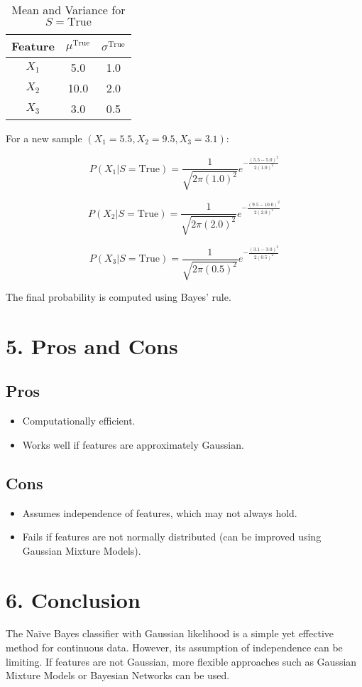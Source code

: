 \documentclass{article}
\begin{document}
\begin{table}[h]
    \centering
    \begin{tabular}{c|cc}
        \toprule
        Feature & \( \mu^{\text{True}} \) & \( \sigma^{\text{True}} \) \\
        \midrule
        \( X_1 \) & 5.0 & 1.0 \\
        \( X_2 \) & 10.0 & 2.0 \\
        \( X_3 \) & 3.0 & 0.5 \\
        \bottomrule
    \end{tabular}
    \caption{Mean and Variance for \( S = \text{True} \)}
\end{table}

For a new sample \( (X_1 = 5.5, X_2 = 9.5, X_3 = 3.1) \):

\[
P(X_1 | S = \text{True}) = \frac{1}{\sqrt{2 \pi (1.0)^2}} e^{-\frac{(5.5 - 5.0)^2}{2 (1.0)^2}}
\]

\[
P(X_2 | S = \text{True}) = \frac{1}{\sqrt{2 \pi (2.0)^2}} e^{-\frac{(9.5 - 10.0)^2}{2 (2.0)^2}}
\]

\[
P(X_3 | S = \text{True}) = \frac{1}{\sqrt{2 \pi (0.5)^2}} e^{-\frac{(3.1 - 3.0)^2}{2 (0.5)^2}}
\]

The final probability is computed using Bayes' rule.

\section{5. Pros and Cons}
\subsection{Pros}
\begin{itemize}
    \item Computationally efficient.
    \item Works well if features are approximately Gaussian.
\end{itemize}

\subsection{Cons}
\begin{itemize}
    \item Assumes independence of features, which may not always hold.
    \item Fails if features are not normally distributed (can be improved using Gaussian Mixture Models).
\end{itemize}

\section{6. Conclusion}
The Naïve Bayes classifier with Gaussian likelihood is a simple yet effective method for continuous data. However, its assumption of independence can be limiting. If features are not Gaussian, more flexible approaches such as Gaussian Mixture Models or Bayesian Networks can be used.
\end{document}
